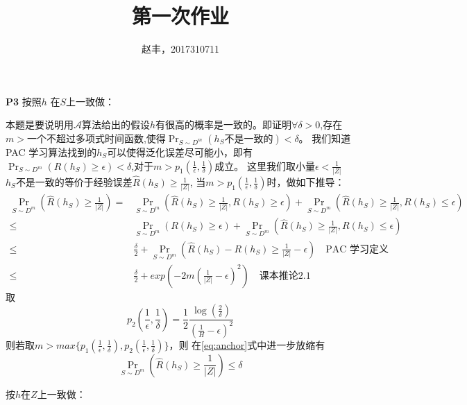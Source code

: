 \documentclass{article}
\begin{document}
\title{第一次作业}
\author{赵丰，2017310711}
\maketitle
\textbf{P3}
按照$h$ 在$S$上一致做：

本题是要说明用$\mathcal{A}$算法给出的假设$h$有很高的概率是一致的。即证明$\forall \delta>0$,存在
$m>$一个不超过多项式时间函数,使得$\Pr_{S\sim D^m}(h_S\text{不是一致的})<\delta$。 
我们知道PAC 学习算法找到的$h_S$可以使得泛化误差尽可能小，即有
$\Pr_{S\sim D^m}(R(h_S)\geq \epsilon)<\delta$,对于$m>p_1(\frac{1}{\epsilon},\frac{1}{\delta})$成立。
这里我们取小量$\epsilon < \frac{1}{|Z|}$
$h_S\text{不是一致的}$等价于经验误差$\hat{R}(h_S)\geq \frac{1}{|Z|}$,
当$m>p_1(\frac{1}{\epsilon},\frac{1}{\delta})$时，做如下推导：
\begin{align}
\Pr_{S\sim D^m}(\hat{R}(h_S)\geq \frac{1}{|Z|})=& \Pr_{S\sim D^m}(\hat{R}(h_S)\geq \frac{1}{|Z|},R(h_S)\geq \epsilon)
+\Pr_{S\sim D^m}(\hat{R}(h_S)\geq \frac{1}{|Z|},R(h_S)\leq \epsilon) \nonumber \\
\leq & \Pr_{S\sim D^m}(R(h_S)\geq \epsilon)+\Pr_{S\sim D^m}(\hat{R}(h_S)\geq \frac{1}{|Z|},R(h_S)\leq \epsilon) \nonumber \\
\leq & \frac{\delta}{2} +\Pr_{S\sim D^m}(\hat{R}(h_S)-R(h_S)\geq \frac{1}{|Z|} -\epsilon) \quad\text{PAC 学习定义} \nonumber \\
\leq &\frac{\delta}{2} +exp\left(-2m(\frac{1}{|Z|}-\epsilon)^2\right)\quad\text{课本推论2.1}\label{eq:anchor}
\end{align}
取
\begin{equation}
p_2(\frac{1}{\epsilon},\frac{1}{\delta})=\frac{1}{2}\frac{\log(\frac{2}{\delta})}{(\frac{1}{H}-\epsilon)^2}
\end{equation}
则若取$m>max\{p_1(\frac{1}{\epsilon},\frac{1}{\delta}),p_2(\frac{1}{\epsilon},\frac{1}{\delta})\}$，则
在\eqref{eq:anchor}式中进一步放缩有
\begin{equation}
\Pr_{S\sim D^m}(\hat{R}(h_S)\geq \frac{1}{|Z|})\leq \delta
\end{equation}

按$h$在$Z$上一致做：
\end{document}

